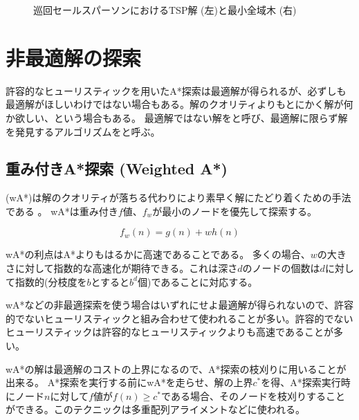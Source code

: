 \begin{figure}[tbh]
  \centering
  \begin{tikzpicture}[scale=0.6]
    
  \end{tikzpicture}
\caption{巡回セールスパーソンにおけるTSP解 (左)と最小全域木 (右)}
\label{fig:tsp-mst}
\end{figure}


\section{非最適解の探索}
\label{sec:inadmissible}

許容的なヒューリスティックを用いたA*探索は最適解が得られるが、必ずしも最適解がほしいわけではない場合もある。解のクオリティよりもとにかく解が何か欲しい、という場合もある。
最適解ではない解をと呼び、最適解に限らず解を発見するアルゴリズムをと呼ぶ。%

\subsection{重み付きA*探索 (Weighted A*)}
\label{sec:weighted-astar-search}

 (wA*)は解のクオリティが落ちる代わりにより素早く解にたどり着くための手法である \cite{wilt2010comparison}。
wA*は重み付き$f$値、$f_w$が最小のノードを優先して探索する。

\begin{equation}
	f_w(n) = g(n) + w h(n)
\end{equation}



wA*の利点はA*よりもはるかに高速であることである。
多くの場合、$w$の大きさに対して指数的な高速化が期待できる。これは深さ$d$のノードの個数は$d$に対して指数的(分枝度を$b$とすると$b^d$個)であることに対応する。

wA*などの非最適探索を使う場合はいずれにせよ最適解が得られないので、許容的でないヒューリスティックと組み合わせて使われることが多い。許容的でないヒューリスティックは許容的なヒューリスティックよりも高速であることが多い。%

wA*の解は最適解のコストの上界になるので、A*探索の枝刈りに用いることが出来る。
A*探索を実行する前にwA*を走らせ、解の上界$c^*$を得、A*探索実行時にノード$n$に対して$f$値が$f(n) \geq c^*$である場合、そのノードを枝刈りすることができる。このテクニックは多重配列アライメントなどに使われる\cite{ikeda1999enhanced}。

